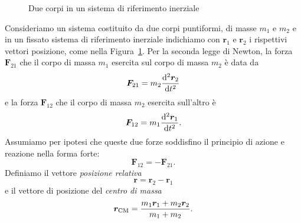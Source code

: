\begin{figure}
  \centering
{}
  \caption{Due corpi in un sistema di riferimento inerziale}
  \label{fig:due-corpi}
\end{figure}
Consideriamo un sistema costituito da due corpi puntiformi, di masse $m_1$ e
$m_2$ e in un fissato sistema di riferimento inerziale indichiamo con $\bm{r}_1$
e $\bm{r}_2$ i rispettivi vettori posizione, come nella
Figura~\ref{fig:due-corpi}. Per la seconda legge di Newton, la forza
$\bm{F}_{21}$ che il corpo di massa $m_1$ esercita sul corpo di massa $m_2$ è
data da
\begin{equation}
  \label{eq:f21}
  \bm{F}_{21} = m_2\toder[2]{\bm{r}_2}{t}
\end{equation}
e la forza $\bm{F}_{12}$ che il corpo di massa $m_2$ esercita sull'altro è
\begin{equation}
  \label{eq:f12}
  \bm{F}_{12} = m_1\toder[2]{\bm{r}_1}{t}.
\end{equation}
Assumiamo per ipotesi che queste due forze soddisfino il principio di azione e
reazione nella forma forte:
\begin{equation}
  \label{eq:azione-reazione}
  \bm{F}_{12} = -\bm{F}_{21}.
\end{equation}
Definiamo il vettore \emph{posizione relativa}
\begin{equation}
  \label{eq:posizione-relativa}
  \bm{r}=\bm{r}_2-\bm{r}_1
\end{equation}
e il vettore di posizione del \emph{centro di massa}
\begin{equation}
  \label{eq:centro-di-massa}
  \bm{r}_\textup{CM} = \frac{m_1\bm{r}_1+m_2\bm{r}_2}{m_1+m_2}.
\end{equation}
